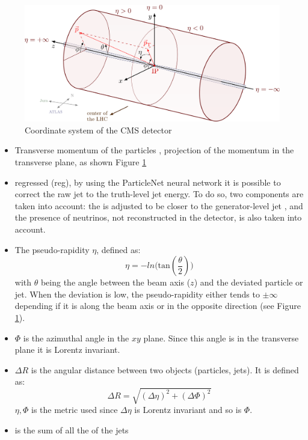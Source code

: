 \begin{figure}[hbt]
    \centering
    \includegraphics[width=0.7\linewidth]{Images/4.HH4b Analysis/axis3D_CMS-005.png}
    \caption{Coordinate system of the CMS detector}
    \label{fig: coord syst}
\end{figure}

\begin{itemize}
    \item Transverse momentum of the particles \pt, projection of the momentum in the transverse plane, as shown Figure \ref{fig: coord syst}
    \item \pt regressed (\pt reg), by using the ParticleNet neural network it is possible to correct the raw jet \pt to the truth-level jet energy. To do so, two components are taken into account: the \pt is adjusted to be closer to the generator-level jet \pt, and the presence of neutrinos, not reconstructed in the detector, is also taken into account.
    \item The pseudo-rapidity $\eta$, defined as:
    \begin{equation}
        \eta=-ln\bigg(\text{tan}(\frac{\theta}{2})\bigg)
    \end{equation}
    with $\theta$ being the angle between the beam axis ($z$) and the deviated particle or jet. When the deviation is low, the pseudo-rapidity either tends to $\pm \infty$ depending if it is along the beam axis or in the opposite direction (see Figure \ref{fig: coord syst}).
    \item $\Phi$ is the azimuthal angle in the $xy$ plane. Since this angle is in the transverse plane it is Lorentz invariant.
    \item $\Delta R$ is the angular distance between two objects (particles, jets). It is defined as:
    \begin{equation}
        \Delta R = \sqrt{(\Delta \eta)^2 + (\Delta \Phi)^2 }
    \end{equation}
    $\eta, \Phi$ is the metric used since $\Delta \eta$ is Lorentz invariant and so is $\Phi$.
    \item \Ht is the sum of all the \pt of the jets

\end{itemize}

